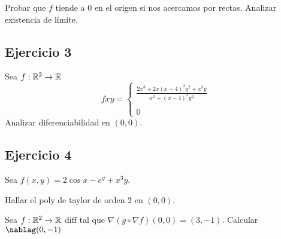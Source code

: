 \documentclass{article}
\begin{document}
Probar que $f$ tiende a $0$ en el origen si nos acercamos por rectas.
Analizar existencia de límite.

\subsection*{Ejercicio 3}
Sea $f : \mathbb{R}^2 \to \mathbb{R}$
\[
	f xy = 
	\begin{cases}
		\frac{2x^3 + 2x(x-4)^2y^2 + x^3y}{x^2 + (x-4)^2y^2}  \\
		\\
		0
	\end{cases}
\]
Analizar diferenciabilidad en $(0,0)$.
\subsection*{Ejercicio 4}
Sea $f(x,y) = 2\cos x - e^y + x^3y$.

Hallar el poly de taylor de orden 2 en $(0,0)$.

Sea $f : \mathbb{R}^2 \to \mathbb{R}$ diff tal que $\nabla(g \circ \nabla f)(0,0) = (3,-1)$. Calcular $\nablag (0,-1)$
\end{document}
